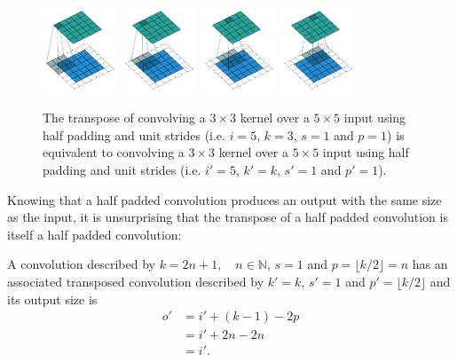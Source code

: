 \documentclass{article}
\begin{document}
\begin{figure}[h]
    \centering
    \includegraphics[width=0.2\textwidth]
        {pdf/same_padding_no_strides_transposed_00.pdf}
    \includegraphics[width=0.2\textwidth]
        {pdf/same_padding_no_strides_transposed_01.pdf}
    \includegraphics[width=0.2\textwidth]
        {pdf/same_padding_no_strides_transposed_02.pdf}
    \includegraphics[width=0.2\textwidth]
        {pdf/same_padding_no_strides_transposed_03.pdf}
    \caption{\label{fig:same_padding_no_strides_transposed} The transpose
        of convolving a $3 \times 3$ kernel over a $5 \times 5$ input using half
        padding and unit strides (i.e. $i = 5$, $k = 3$, $s = 1$ and $p = 1$) is
        equivalent to convolving a $3 \times 3$ kernel over a $5 \times 5$ input
        using half padding and unit strides (i.e. $i' = 5$, $k' = k$, $s' = 1$
        and $p' = 1$).}
\end{figure}

Knowing that a half padded convolution produces an output with the same size as
the input, it is unsurprising that the transpose of a half padded convolution
is itself a half padded convolution:

\begin{prop}\label{prop:half_padding_no_strides_transposed}
A convolution described by $k = 2n + 1, \quad n \in \mathbb{N}$, $s = 1$ and $p
= \lfloor k / 2 \rfloor = n$ has an associated transposed convolution described
by $k' = k$, $s' = 1$ and $p' = \lfloor k / 2 \rfloor$ and its output size is
\begin{equation*}
\begin{split}
    o' &= i' + (k - 1) - 2p \\
       &= i' + 2n - 2n \\
       &= i'.
\end{split}
\end{equation*}
\end{prop}
\end{document}
